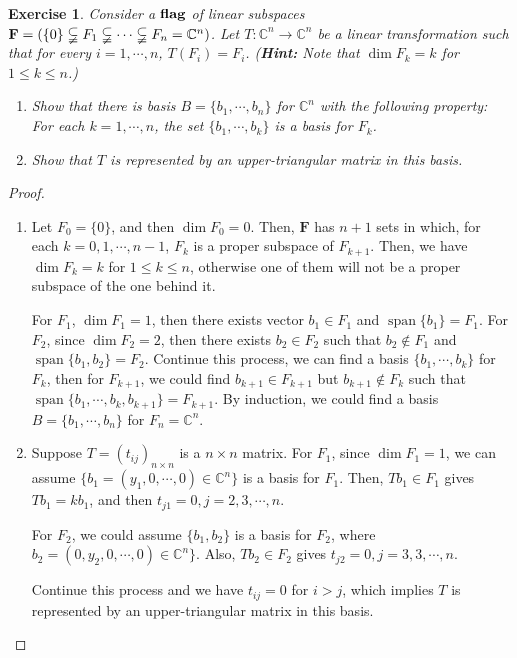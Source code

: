 \documentclass[11pt]{article}
\newtheorem{exercise}{Exercise}[section]
\theoremstyle{definition}
\numberwithin{equation}{subsection}
\begin{document}
\begin{exercise}
Consider a ${\bf flag}$ of linear subspaces ${\bf F} = \left(\{0\} \subsetneqq F_1 \subsetneqq \cdots \subsetneqq F_n = \mathbb{C}^n \right)$. Let $T:\mathbb{C}^n \to \mathbb{C}^n$ be a linear transformation such that for every $i = 1, \cdots, n$, $T(F_i) = F_i$. (\textbf{Hint:} Note that $\dim F_k = k$ for $1 \leq k \leq n$.)
\begin{enumerate}[label=(\alph*)]
    \item Show that there is basis $B = \{b_1, \cdots, b_n\}$ for $\mathbb{C}^n$ with the following property: For each $k = 1, \cdots, n$, the set $\{b_1, \cdots, b_k\}$ is a basis for $F_k$.
    
    \item Show that $T$ is represented by an upper-triangular matrix in this basis.
\end{enumerate}
\end{exercise}
\begin{proof}
~\begin{enumerate}[label=(\alph*)]
    \item Let $F_0 = \{0\}$, and then $\dim F_0 = 0$. Then, $\textbf{F}$ has $n + 1$ sets in which, for each $k = 0, 1, \cdots, n-1$, $F_k$ is a proper subspace of $F_{k+1}$. Then, we have $\dim F_k = k$ for $1 \leq k \leq n$, otherwise one of them will not be a proper subspace of the one behind it.
    
    For $F_1$, $\dim F_1 = 1$, then there exists vector $b_1 \in F_1$ and $\operatorname{span}\{b_1\} = F_1$. For $F_2$, since $\dim F_2 = 2$, then there exists $b_2 \in F_2$ such that $b_2 \notin F_1$ and $\operatorname{span}\{b_1, b_2\} = F_2$. Continue this process, we can find a basis $\{b_1, \cdots, b_k\}$ for $F_k$, then for $F_{k+1}$, we could find $b_{k+1} \in F_{k+1}$ but $b_{k+1} \notin F_k$ such that $\operatorname{span}\{b_1, \cdots, b_k, b_{k+1}\} = F_{k+1}$. By induction, we could find a basis $B = \{b_1, \cdots, b_n\}$ for $F_n = \mathbb{C}^n$.
    
    \item Suppose $T = (t_{ij})_{n \times n}$ is a $n \times n$ matrix. For $F_1$, since $\dim F_1 = 1$, we can assume $\{b_1 = (y_1, 0, \cdots, 0) \in \mathbb{C}^n\}$ is a basis for $F_1$. Then, $Tb_1 \in F_1$ gives $Tb_1 = k b_1$, and then $t_{j1} = 0, j = 2, 3, \cdots, n$. 
    
    For $F_2$, we could assume $\{b_1, b_2\}$ is a basis for $F_2$, where $b_2 = (0, y_2, 0, \cdots, 0) \in \mathbb{C}^n\}$. Also, $Tb_2 \in F_2$ gives $t_{j2} = 0, j = 3, 3, \cdots, n$.
    
    Continue this process and we have $t_{ij} = 0$ for $i > j$, which implies $T$ is represented by an upper-triangular matrix in this basis.
\end{enumerate}
\end{proof}
\end{document}
